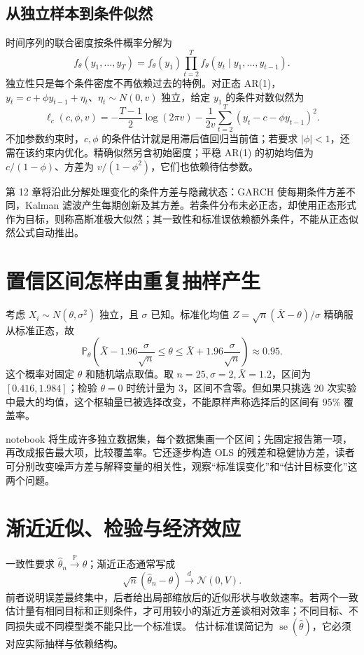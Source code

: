 \subsection{从独立样本到条件似然}
时间序列的联合密度按条件概率分解为
\[
 f_\theta(y_1,\ldots,y_T)=f_\theta(y_1)
 \prod_{t=2}^T f_\theta(y_t\mid y_1,\ldots,y_{t-1}).
\]
独立性只是每个条件密度不再依赖过去的特例。对正态 AR(1)，$y_t=c+\phi y_{t-1}+\eta_t$、$\eta_t\sim N(0,v)$ 独立，给定 $y_1$ 的条件对数似然为
\[
 \ell_c(c,\phi,v)
 =-\frac{T-1}{2}\log(2\pi v)
 -\frac1{2v}\sum_{t=2}^T(y_t-c-\phi y_{t-1})^2.
\]
不加参数约束时，$c,\phi$ 的条件估计就是用滞后值回归当前值；若要求 $|\phi|<1$，还需在该约束内优化。精确似然另含初始密度；平稳 AR(1) 的初始均值为 $c/(1-\phi)$、方差为 $v/(1-\phi^2)$，它们也依赖待估参数。

第 12 章将沿此分解处理变化的条件方差与隐藏状态：GARCH 使每期条件方差不同，Kalman 滤波产生每期创新及其方差。若条件分布未必正态，却使用正态形式作为目标，则称高斯准极大似然；其一致性和标准误依赖额外条件，不能从正态似然公式自动推出。

\section{置信区间怎样由重复抽样产生}

考虑 $X_i\sim N(\theta,\sigma^2)$ 独立，且 $\sigma$ 已知。标准化均值 $Z=\sqrt n(\bar X-\theta)/\sigma$ 精确服从标准正态，故
\[
 \mathbb P_\theta\left(\bar X-1.96\frac\sigma{\sqrt n}
 \leq\theta\leq\bar X+1.96\frac\sigma{\sqrt n}\right)\approx0.95.
\]
这个概率对固定 $\theta$ 和随机端点取值。取 $n=25,\sigma=2,\bar X=1.2$，区间为 $[0.416,1.984]$；检验 $\theta=0$ 时统计量为 3，区间不含零。但如果只挑选 20 次实验中最大的均值，这个枢轴量已被选择改变，不能原样声称选择后的区间有 95\% 覆盖率。

notebook 将生成许多独立数据集，每个数据集画一个区间；先固定报告第一项，再改成报告最大项，比较覆盖率。它还逐步构造 OLS 的残差和稳健协方差，读者可分别改变噪声方差与解释变量的相关性，观察“标准误变化”和“估计目标变化”这两个问题。

\section{渐近近似、检验与经济效应}

一致性要求 $\hat\theta_n\xrightarrow{\mathbb P}\theta$；渐近正态通常写成
\[
 \sqrt n(\hat\theta_n-\theta)\xrightarrow d\mathcal N(0,V).
\]
前者说明误差最终集中，后者给出局部缩放后的近似形状与收敛速率。若两个一致估计量有相同目标和正则条件，才可用较小的渐近方差谈相对效率；不同目标、不同损失或不同模型类不能只比一个标准误。
估计标准误简记为 $\operatorname{se}(\hat\theta)$，它必须对应实际抽样与依赖结构。

